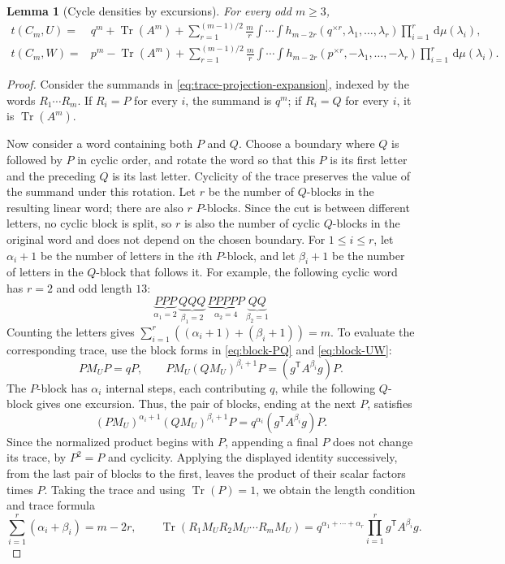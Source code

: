 \documentclass[11pt]{article}
\newtheorem{lemma}[theorem]{Lemma}
\numberwithin{equation}{section}
\newcommand{\Tr}{\operatorname{Tr}}
\newcommand{\dd}{\,\mathrm d}
\newcommand{\tC}[2]{t(C_{#1},#2)}
\newcommand{\rep}[2]{#1^{\times #2}}
\begin{document}
\begin{lemma}[Cycle densities by excursions]
\label{lem:cycle-excursions}
  For every odd $m\ge3$,
  \begin{align}
    \tC mU
    ={}&q^m+\Tr(A^m)
    +\sum_{r=1}^{(m-1)/2}\frac mr
      \int\!\cdots\!\int
      h_{m-2r}(\rep qr,\lambda_1,\ldots,\lambda_r)
      \prod_{i=1}^r\dd\mu(\lambda_i),
    \label{eq:cycle-U}\\
    \tC mW
    ={}&p^m-\Tr(A^m)
    +\sum_{r=1}^{(m-1)/2}\frac mr
      \int\!\cdots\!\int
      h_{m-2r}(\rep pr,-\lambda_1,\ldots,-\lambda_r)
      \prod_{i=1}^r\dd\mu(\lambda_i).
    \label{eq:cycle-W}
  \end{align}
\end{lemma}

\begin{proof}
  Consider the summands in \eqref{eq:trace-projection-expansion}, indexed by the words $R_1\cdots R_m$.
  If $R_i=P$ for
  every $i$, the summand is $q^m$; if $R_i=Q$ for every $i$, it is
  $\Tr(A^m)$.

  Now consider a word containing both $P$ and $Q$.
  Choose a boundary where $Q$ is followed by $P$ in cyclic order, and rotate the word so that this $P$ is its first letter and the preceding $Q$ is its last letter.
  Cyclicity of the trace preserves the value of the summand under this rotation.
  Let $r$ be the number of $Q$-blocks in the resulting linear word; there are also $r$ $P$-blocks.
  Since the cut is between different letters, no cyclic block is split, so $r$ is also the number of cyclic $Q$-blocks in the original word and does not depend on the chosen boundary.
  For $1\le i\le r$, let $\alpha_i+1$ be the
  number of letters in the $i$th $P$-block, and let $\beta_i+1$ be the
  number of letters in the $Q$-block that follows it. For example, the
  following cyclic word has $r=2$ and odd length $13$:
  \[
    \underbrace{PPP}_{\alpha_1=2}\,
    \underbrace{QQQ}_{\beta_1=2}\,
    \underbrace{PPPPP}_{\alpha_2=4}\,
    \underbrace{QQ}_{\beta_2=1}
  \]
  Counting the letters gives $\sum_{i=1}^r((\alpha_i+1)+(\beta_i+1))=m$.
  To evaluate the corresponding trace, use the block forms in \eqref{eq:block-PQ} and \eqref{eq:block-UW}:
  \[
    P M_U P=qP,
    \qquad
    P M_U(Q M_U)^{\beta_i+1}P
    =(g^{\mathsf T}A^{\beta_i}g)P.
  \]
  The $P$-block has $\alpha_i$ internal steps, each contributing $q$, while the following $Q$-block gives one excursion.
  Thus, the pair of blocks, ending at the next $P$, satisfies
  \[
    (P M_U)^{\alpha_i+1}(Q M_U)^{\beta_i+1}P
    =q^{\alpha_i}(g^{\mathsf T}A^{\beta_i}g)P.
  \]
  Since the normalized product begins with $P$, appending a final $P$ does not change its trace, by $P^2=P$ and cyclicity.
  Applying the displayed identity successively, from the last pair of blocks to the first, leaves the product of their scalar factors times $P$.
  Taking the trace and using $\Tr(P)=1$, we obtain the length condition and trace formula
  \begin{equation}\label{eq:excursion-length-weight}
    \sum_{i=1}^r(\alpha_i+\beta_i)=m-2r,
    \qquad
    \Tr(R_1M_UR_2M_U\cdots R_mM_U)
    =q^{\alpha_1+\cdots+\alpha_r}
     \prod_{i=1}^rg^{\mathsf T}A^{\beta_i}g.
  \end{equation}


\end{proof}
\end{document}
